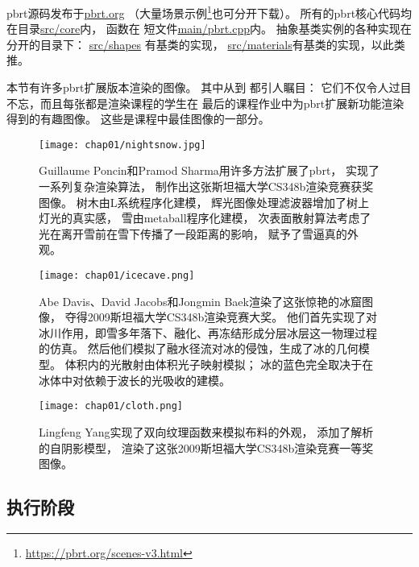 pbrt源码发布于\href{https://pbrt.org/}{\ttfamily pbrt.org}
（大量场景示例\footnote{\url{https://pbrt.org/scenes-v3.html}}也可分开下载）。
所有的pbrt核心代码均在目录\href{https://github.com/mmp/pbrt-v3/tree/master/src/core}{\ttfamily src/core}内，
函数在
短文件\href{https://github.com/mmp/pbrt-v3/tree/master/src/main/pbrt.cpp}{\ttfamily main/pbrt.cpp}内。
抽象基类实例的各种实现在分开的目录下：
\href{https://github.com/mmp/pbrt-v3/tree/master/src/shapes}{\ttfamily src/shapes}
有基类的实现，
\href{https://github.com/mmp/pbrt-v3/tree/master/src/materials}{\ttfamily src/materials}有基类的实现，以此类推。

本节有许多pbrt扩展版本渲染的图像。
其中从到
都引人瞩目：
它们不仅令人过目不忘，而且每张都是渲染课程的学生在
最后的课程作业中为pbrt扩展新功能渲染得到的有趣图像。
这些是课程中最佳图像的一部分。
\begin{figure}[htbp]
    \centering\texttt{[image: chap01/nightsnow.jpg]}
    \caption{Guillaume Poncin和Pramod Sharma用许多方法扩展了pbrt，
        实现了一系列复杂渲染算法，
        制作出这张斯坦福大学CS348b渲染竞赛获奖图像。
        树木由L系统程序化建模，
        辉光图像处理滤波器增加了树上灯光的真实感，
        雪由metaball程序化建模，
        次表面散射算法考虑了光在离开雪前在雪下传播了一段距离的影响，
        赋予了雪逼真的外观。}
    \label{fig:1.11}
\end{figure}
\begin{figure}[htbp]
    \centering\texttt{[image: chap01/icecave.png]}
    \caption{Abe Davis、David Jacobs和Jongmin Baek渲染了这张惊艳的冰窟图像，
        夺得2009斯坦福大学CS348b渲染竞赛大奖。
        他们首先实现了对冰川作用，即雪多年落下、融化、再冻结形成分层冰层这一物理过程的仿真。
        然后他们模拟了融水径流对冰的侵蚀，生成了冰的几何模型。
        体积内的光散射由体积光子映射模拟；
        冰的蓝色完全取决于在冰体中对依赖于波长的光吸收的建模。}
    \label{fig:1.12}
\end{figure}
\begin{figure}[htbp]
    \centering\texttt{[image: chap01/cloth.png]}
    \caption{Lingfeng Yang实现了双向纹理函数来模拟布料的外观，
        添加了解析的自阴影模型，
        渲染了这张2009斯坦福大学CS348b渲染竞赛一等奖图像。}
    \label{fig:1.13}
\end{figure}

\subsection{执行阶段}\label{sub:执行阶段}

